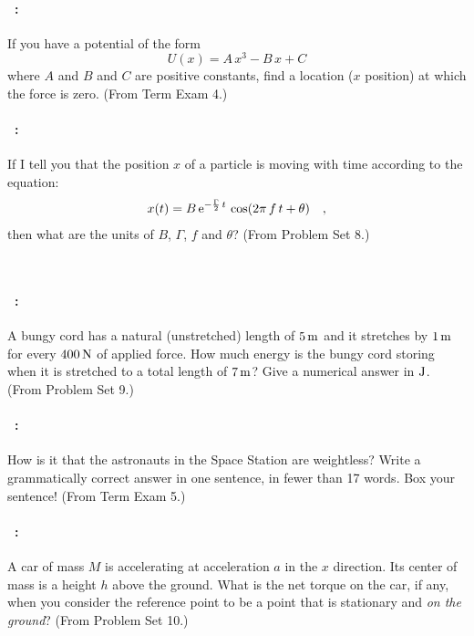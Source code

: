 \documentclass[12pt]{article} 
\begin{document}
\vfill

\paragraph{\problemname~\theproblem:}%
If you have a potential of the form
$$
U(x) = A\,x^3 - B\,x + C
$$ where $A$ and $B$ and $C$ are positive constants, find a location ($x$ position) at which
the force is zero.
(From Term Exam 4.)

\vfill

\paragraph{\problemname~\theproblem:}%
If I tell you that the position $x$ of a particle is moving with
time according to the equation:
\begin{equation}
x(t) = B\,\mathrm{e}^{-\frac{\Gamma}{2}\,t}\,\cos (2\pi\,f\,t + \theta)
\quad ,
\end{equation}
then what are the units of $B$, $\Gamma$, $f$ and $\theta$?
(From Problem Set 8.)

\vfill
~
\clearpage

\paragraph{\problemname~\theproblem:}%
A bungy cord has a natural (unstretched) length of $5\,\mathrm{m}$ and it
stretches by $1\,\mathrm{m}$ for every $400\,\mathrm{N}$ of applied force. How much
energy is the bungy cord storing when it is stretched to
a total length of $7\,\mathrm{m}$? Give a numerical answer in $\mathrm{J}$.
(From Problem Set 9.)

\vfill

\paragraph{\problemname~\theproblem:}%
How is it that the astronauts in the Space Station are weightless?
Write a grammatically correct answer in one sentence, in fewer than 17
words.  Box your sentence!
(From Term Exam 5.)

\vfill

\paragraph{\problemname~\theproblem:}%
A car of mass $M$ is accelerating at acceleration $a$ in the $x$
direction. Its center of mass is a height $h$ above the ground.  What
is the net torque on the car, if any, when you consider the reference point to be
a point that is stationary and \emph{on the ground}?
(From Problem Set 10.)
\end{document}
